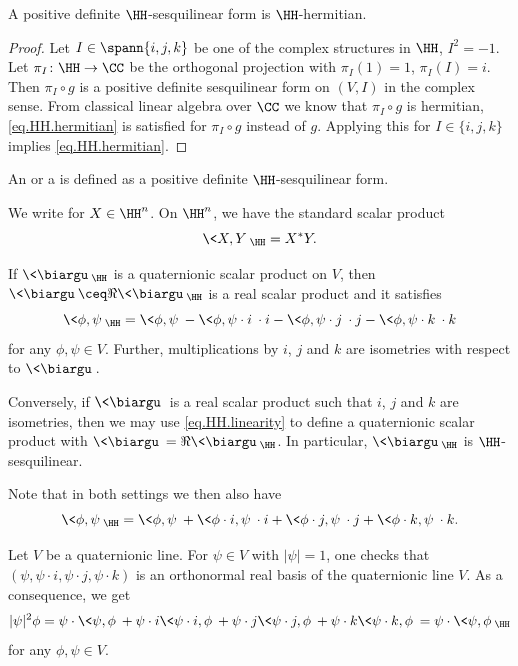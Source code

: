 \begin{Lemma}
A positive definite $\HH$-sesquilinear form is $\HH$-hermitian.
\end{Lemma}

\begin{proof}
Let $I\in \spann\{i,j,k\}$ be one of the complex structures in $\HH$, \ie $I^2=-1$.
Let $\pi_I\colon \HH\to \CC$ be the orthogonal projection with $\pi_I(1)=1$, $\pi_I(I)=i$.
Then $\pi_I\circ g$ is a positive definite sesquilinear form on $(V,I)$ in the complex sense.
From classical linear algebra over $\CC$ we know that $\pi_I\circ g$ is hermitian, \ie \eqref{eq.HH.hermitian} is satisfied for $\pi_I\circ g$ instead of $g$.
Applying this for $I\in \{i,j,k\}$ implies \eqref{eq.HH.hermitian}.
 \end{proof}

An  or a  is defined as a positive definite $\HH$-sesqui\-linear form.

\begin{Example}
We write  for $X\in \HH^n$. On $\HH^n$, we have the standard scalar product
\[
\<X,Y\>_\HH= X^* Y.
\]
\end{Example}
If $\<\biargu\>_\HH$ is a quaternionic scalar product on $V$, then $\<\biargu\>\ceq \Re \<\biargu\>_\HH$ is a real scalar product and it satisfies
\begin{equation}\label{eq.HH.linearity}
\<\phi,\psi\>_\HH = \<\phi,\psi\>- \<\phi,\psi\cdot i \> \cdot i - \<\phi,\psi\cdot j \> \cdot j - \<\phi,\psi\cdot k \> \cdot k
\end{equation}
for any $\phi,\psi\in V$. Further, multiplications by $ i $, $ j $ and $ k $ are isometries with respect to
$\<\biargu\>$.

Conversely, if $\<\biargu\>$ is a real scalar product such that $ i $, $ j $ and $ k $ are isometries, then we may use \eqref{eq.HH.linearity} to define a quaternionic scalar product with $\<\biargu\>= \Re \<\biargu\>_\HH$.
In particular, $\<\biargu\>_\HH$ is $\HH$-sesquilinear.

Note that in both settings we then also have
\begin{equation*} %
\<\phi,\psi\>_\HH = \<\phi,\psi\>+\<\phi\cdot i ,\psi\> \cdot i + \<\phi\cdot j ,\psi\> \cdot j + \<\phi\cdot k ,\psi\> \cdot k .
\end{equation*}

Let $V$ be a quaternionic line.
For $\psi\in V$ with $|\psi|=1$, one checks that $(\psi,\psi\cdot i ,\psi \cdot j , \psi\cdot k )$ is an orthonormal real basis of the quaternionic line $V$. As a consequence, we get
\begin{align}
|\psi|^2\phi
=
\psi \cdot \<\psi,\phi\>
+ \psi \cdot i \<\psi\cdot i ,\phi \>
+ \psi \cdot j \<\psi\cdot j ,\phi \>
+ \psi \cdot k \<\psi\cdot k ,\phi\>
=
\psi \cdot \<\psi,\phi\>_\HH\label{formula.HH.basis}
\end{align}
for any $\phi,\psi\in V$.


